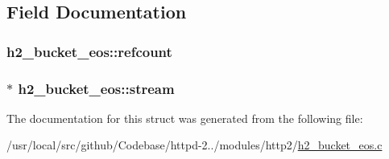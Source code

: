 \subsection{Field Documentation}
\subsubsection[{\texorpdfstring{refcount}{refcount}}]{ h2\+\_\+bucket\+\_\+eos\+::refcount}\hypertarget{structh2__bucket__eos_adec1e50fc255bbc2550f4da9a600a2d9}{}\label{structh2__bucket__eos_adec1e50fc255bbc2550f4da9a600a2d9}
\subsubsection[{\texorpdfstring{stream}{stream}}]{$\ast$ h2\+\_\+bucket\+\_\+eos\+::stream}\hypertarget{structh2__bucket__eos_a314f10f3da5ca4e49518c60e6dad5fda}{}\label{structh2__bucket__eos_a314f10f3da5ca4e49518c60e6dad5fda}


The documentation for this struct was generated from the following file\+:\begin{DoxyCompactItemize}
\item 
/usr/local/src/github/\+Codebase/httpd-\/2../modules/http2/\hyperlink{h2__bucket__eos_8c}{h2\+\_\+bucket\+\_\+eos.\+c}\end{DoxyCompactItemize}
